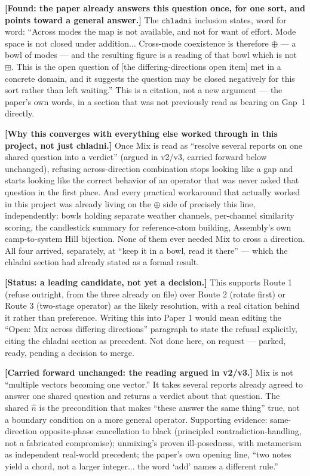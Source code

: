 \documentclass[11pt]{article}
\begin{document}
\textbf{[Found: the paper already answers this question once, for one
sort, and points toward a general answer.]} The $\mathtt{chladni}$
inclusion states, word for word: ``Across modes the map is not
available, and not for want of effort. Mode space is not closed under
addition... Cross-mode coexistence is therefore $\oplus$ --- a bowl of
modes --- and the resulting figure is a reading of that bowl which is
not $\boxplus$. This is the open question of
[the differing-directions open item] met in a concrete domain,
and it suggests the question may be closed negatively for this sort
rather than left waiting.'' This is a citation, not a new argument ---
the paper's own words, in a section that was not previously read as
bearing on Gap~1 directly.

\textbf{[Why this converges with everything else worked through in
this project, not just chladni.]} Once Mix is read as ``resolve
several reports on one shared question into a verdict'' (argued in
v2/v3, carried forward below unchanged), refusing across-direction
combination stops looking like a gap and starts looking like the
correct behavior of an operator that was never asked that question in
the first place. And every practical workaround that actually worked
in this project was already living on the $\oplus$ side of precisely
this line, independently: bowls holding separate weather channels,
per-channel similarity scoring, the candlestick summary for
reference-atom building, Assembly's own camp-to-system Hill bijection.
None of them ever needed Mix to cross a direction. All four arrived,
separately, at ``keep it in a bowl, read it there'' --- which the
chladni section had already stated as a formal result.

\textbf{[Status: a leading candidate, not yet a decision.]} This
supports Route 1 (refuse outright, from the three already on file)
over Route 2 (rotate first) or Route 3 (two-stage operator) as the
likely resolution, with a real citation behind it rather than
preference. Writing this into Paper 1 would mean editing the
``Open: Mix across differing directions'' paragraph to state the
refusal explicitly, citing the chladni section as precedent. Not done
here, on request --- parked, ready, pending a decision to merge.

\textbf{[Carried forward unchanged: the reading argued in v2/v3.]} Mix
is not ``multiple vectors becoming one vector.'' It takes several
reports already agreed to answer one shared question and returns a
verdict about that question. The shared $\hat n$ is the precondition
that makes ``these answer the same thing'' true, not a boundary
condition on a more general operator. Supporting evidence: same-
direction opposite-phase cancellation to black (principled
contradiction-handling, not a fabricated compromise); unmixing's
proven ill-posedness, with metamerism as independent real-world
precedent; the paper's own opening line, ``two notes yield a chord,
not a larger integer... the word `add' names a different rule.''
\end{document}
